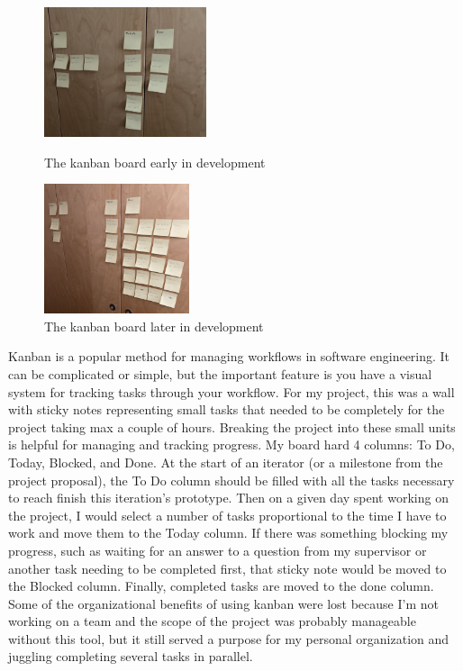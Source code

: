 \documentclass[12pt,a4paper,twoside,openright]{report}
\begin{document}
\begin{figure}[H]
   \centering
   \begin{minipage}{0.45\textwidth}
      \centering
      \includegraphics[height=1.5in]{kanban-early}
      \caption{The kanban board early in development}
   \end{minipage}\hfill
   \begin{minipage}{0.45\textwidth}
      \centering
      \includegraphics[height=1.5in]{kanban-late}
      \caption{The kanban board later in development}
   \end{minipage}
\end{figure}
Kanban is a popular method for managing workflows in software engineering.
It can be complicated or simple, but the important feature is you have a visual system for tracking tasks through your workflow.
For my project, this was a wall with sticky notes representing small tasks that needed to be completely for the project taking max a couple of hours.
Breaking the project into these small units is helpful for managing and tracking progress.
My board hard 4 columns: To Do, Today, Blocked, and Done.
At the start of an iterator (or a milestone from the project proposal), the To Do column should be filled with all the tasks necessary to reach finish this iteration's prototype.
Then on a given day spent working on the project, I would select a number of tasks proportional to the time I have to work and move them to the Today column.
If there was something blocking my progress, such as waiting for an answer to a question from my supervisor or another task needing to be completed first, that sticky note would be moved to the Blocked column.
Finally, completed tasks are moved to the done column.
Some of the organizational benefits of using kanban were lost because I'm not working on a team and the scope of the project was probably manageable without this tool, but it still served a purpose for my personal organization and juggling completing several tasks in parallel.
\end{document}

